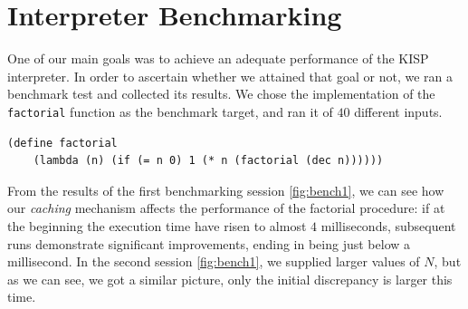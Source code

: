 \section{Interpreter Benchmarking}
One of our main goals was to achieve an adequate performance of the KISP interpreter. In order to ascertain whether we attained
that goal or not, we ran a benchmark test and collected its results. We chose the implementation of the \texttt{factorial}
function as the benchmark target, and ran it of $40$ different inputs.
\begin{verbatim}
(define factorial
    (lambda (n) (if (= n 0) 1 (* n (factorial (dec n))))))
\end{verbatim}

From the results of the first benchmarking session \ref{fig:bench1}, we can see how our \textit{caching} mechanism affects the
performance of the factorial procedure: if at the beginning the execution time have risen to almost $4$ milliseconds,
subsequent runs demonstrate significant improvements, ending in being just below a millisecond.
In the second session \ref{fig:bench1}, we supplied larger values of $N$, but as we can see, we got a similar picture, only the
initial discrepancy is larger this time.

